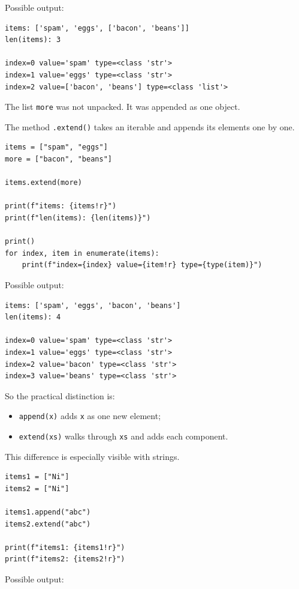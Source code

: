 Possible output:

\begin{verbatim}
items: ['spam', 'eggs', ['bacon', 'beans']]
len(items): 3

index=0 value='spam' type=<class 'str'>
index=1 value='eggs' type=<class 'str'>
index=2 value=['bacon', 'beans'] type=<class 'list'>
\end{verbatim}

The list \texttt{more} was not unpacked. It was appended as one object.

The method \texttt{.extend()} takes an iterable and appends its elements one by one.

\begin{verbatim}
items = ["spam", "eggs"]
more = ["bacon", "beans"]

items.extend(more)

print(f"items: {items!r}")
print(f"len(items): {len(items)}")

print()
for index, item in enumerate(items):
    print(f"index={index} value={item!r} type={type(item)}")
\end{verbatim}

Possible output:

\begin{verbatim}
items: ['spam', 'eggs', 'bacon', 'beans']
len(items): 4

index=0 value='spam' type=<class 'str'>
index=1 value='eggs' type=<class 'str'>
index=2 value='bacon' type=<class 'str'>
index=3 value='beans' type=<class 'str'>
\end{verbatim}

So the practical distinction is:

\begin{itemize}
    \item \texttt{append(x)} adds \texttt{x} as one new element;
    \item \texttt{extend(xs)} walks through \texttt{xs} and adds each component.
\end{itemize}

This difference is especially visible with strings.

\begin{verbatim}
items1 = ["Ni"]
items2 = ["Ni"]

items1.append("abc")
items2.extend("abc")

print(f"items1: {items1!r}")
print(f"items2: {items2!r}")
\end{verbatim}

Possible output:

